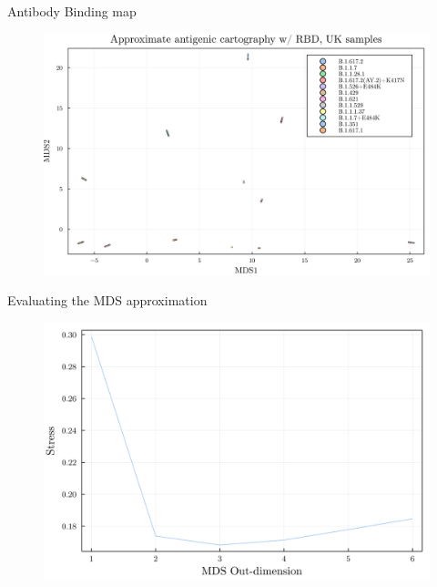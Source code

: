 \documentclass{beamer}
\begin{document}
\begin{frame}{Antibody Binding map}
    \begin{figure}
        \includegraphics[width=\textwidth]{my_figs/usa_multidimensional_scaling_binding.png}
    \end{figure}
\end{frame}



\begin{frame}{Evaluating the MDS approximation}
    \begin{figure}
        \includegraphics[width=\textwidth]{my_figs/usa_mds_stress.png}
    \end{figure}
\end{frame}
\end{document}
